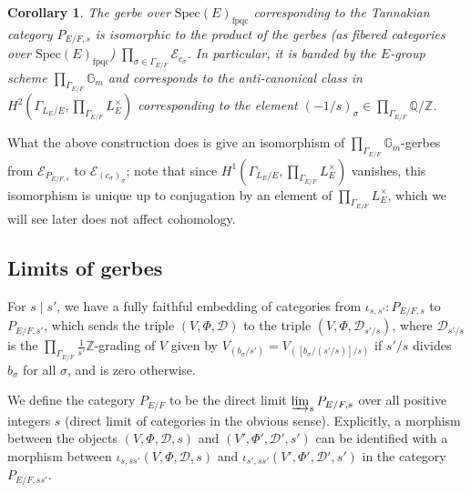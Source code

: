 \documentclass[11pt]{amsart}
\newtheorem{cor}[thm]{Corollary}
\theoremstyle{definition}
\newcommand{\mc}{\mathcal}
\newcommand{\Z}{\mathbb{Z}}
\begin{document}
\begin{cor}\label{productgerbe} The gerbe over $\text{Spec}(E)_{\text{fpqc}}$ corresponding to the Tannakian category $P_{E/F,s}$ is isomorphic to the product of the gerbes (as fibered categories over $\text{Spec}(E)_{\text{fpqc}}$) $\prod_{\sigma \in \Gamma_{E/F}} \mc{E}_{c_{\sigma}}$. In particular, it is banded by the $E$-group scheme $\prod_{\Gamma_{E/F}} \mathbb{G}_{m}$ and corresponds to the anti-canonical class in $H^{2}(\Gamma_{L_{E}/E}, \prod_{\Gamma_{E/F}} L_{E}^{\times})$ corresponding to the element $(-1/s)_{\sigma} \in \prod_{\Gamma_{E/F}} \mathbb{Q}/\Z$.
\end{cor}

What the above construction does is give an isomorphism of $\prod_{\Gamma_{E/F}}\mathbb{G}_{m}$-gerbes from $\mc{E}_{P_{E/F,s}}$ to $\mc{E}_{(c_{\sigma})_{\sigma}}$; note that since $H^{1}(\Gamma_{L_{E}/E}, \prod_{\Gamma_{E/F}} L_{E}^{\times})$ vanishes, this isomorphism is unique up to conjugation by an element of $\prod_{\Gamma_{E/F}} L_{E}^{\times}$, which we will see later does not affect cohomology.

\subsection{Limits of gerbes}
For $s \mid s'$, we have a fully faithful embedding of categories from $\iota_{s,s'} \colon P_{E/F,s}$ to $P_{E/F,s'}$, which sends the triple $(V, \Phi, \mathcal{D})$ to the triple $(V, \Phi, \mathcal{D}_{s'/s})$, where $\mathcal{D}_{s'/s}$ is the ${\prod_{\Gamma_{E/F}}\frac{1}{s'}\mathbb{Z}}$-grading of $V$ given by $V_{(b_{\sigma}/s')} = V_{([b_{\sigma}/(s'/s)]/s)}$ if $s'/s$ divides $b_{\sigma}$ for all $\sigma$, and is zero otherwise. 

We define the category $P_{E/F}$ to be the direct limit $\varinjlim_{s} P_{E/F,s}$ over all positive integers $s$ (direct limit of categories in the obvious sense). Explicitly, a morphism between the objects $(V, \Phi, \mathcal{D}, s)$ and $(V', \Phi', \mathcal{D}', s')$ can be identified with a morphism between $\iota_{s, ss'}(V, \Phi, \mathcal{D}, s)$ and $\iota_{s', ss'}(V', \Phi', \mathcal{D}', s')$ in the category $P_{E/F,ss'}$. 
\end{document}
